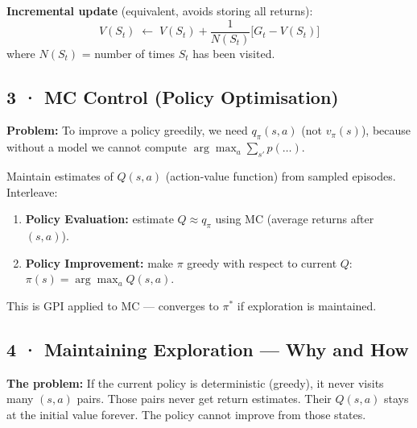 \documentclass[11pt,a4paper]{article}
\begin{document}
\textbf{Incremental update} (equivalent, avoids storing all returns):
\[
  V(S_t) \;\leftarrow\; V(S_t) + \frac{1}{N(S_t)}\bigl[G_t - V(S_t)\bigr]
\]
where $N(S_t)$ = number of times $S_t$ has been visited.

\subsection*{3 · MC Control (Policy Optimisation)}

\textbf{Problem:} To improve a policy greedily, we need $q_\pi(s,a)$ (not $v_\pi(s)$),
because without a model we cannot compute $\arg\max_a \sum_{s'} p(\ldots)$.

\begin{tcolorbox}[defn={MC Control — General Approach}]
Maintain estimates of $Q(s,a)$ (action-value function) from sampled episodes.
Interleave:
\begin{enumerate}
  \item \textbf{Policy Evaluation:} estimate $Q \approx q_\pi$ using MC (average returns after $(s,a)$).
  \item \textbf{Policy Improvement:} make $\pi$ greedy with respect to current $Q$:
  $\pi(s) = \arg\max_a Q(s,a)$.
\end{enumerate}
This is GPI applied to MC — converges to $\pi^*$ if exploration is maintained.
\end{tcolorbox}

\subsection*{4 · Maintaining Exploration — Why and How}

\textbf{The problem:} If the current policy is deterministic (greedy), it never visits many
$(s,a)$ pairs. Those pairs never get return estimates. Their $Q(s,a)$ stays at the initial
value forever. The policy cannot improve from those states.
\end{document}
